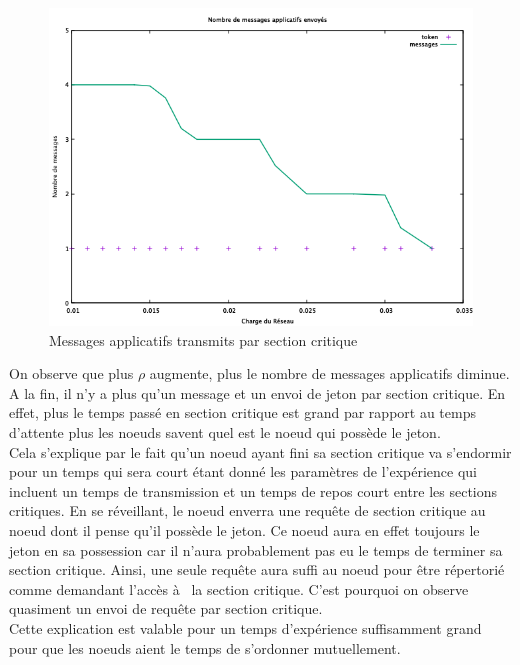 \documentclass[11pt,a4paper]{report}
\begin{document}
\begin{figure}
	\begin{center}
		\includegraphics[scale=0.6]{Messages_applicatifs.png}
	\end{center}
	\caption{\label{Messages_applicatifs} Messages applicatifs transmits par section critique}
\end{figure}

On observe que plus $\rho$ augmente, plus le nombre de messages applicatifs diminue. A la fin, il n'y a plus qu'un message et un envoi de jeton par section critique. En effet, plus le temps passé en section critique est grand par rapport au temps d'attente plus les noeuds savent quel est le noeud qui possède le jeton.\\

Cela s'explique par le fait qu'un noeud ayant fini sa section critique va s'endormir pour un temps qui sera court étant donné les paramètres de l'expérience qui incluent un temps de transmission et un temps de repos court entre les sections critiques. En se réveillant, le noeud enverra une requête de section critique au noeud dont il pense qu'il possède le jeton. Ce noeud aura en effet toujours le jeton en sa possession car il n'aura probablement pas eu le temps de terminer sa section critique. Ainsi, une seule requête aura suffi au noeud pour être répertorié comme demandant l'accès à  la section critique. C'est pourquoi on observe quasiment un envoi de requête par section critique.\\

Cette explication est valable pour un temps d'expérience suffisamment grand pour que les noeuds aient le temps de s'ordonner mutuellement.\\
\end{document}
